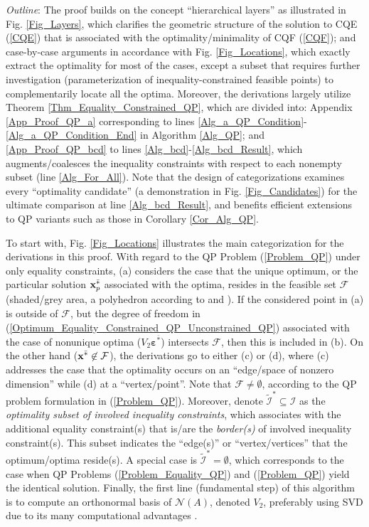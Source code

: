 \documentclass{imaman}
\newcommand{\bfx}{{\bf x}}
\newcommand{\bfvarepsilon}{{\boldsymbol \varepsilon}}
\newcommand{\calF}{{\mathcal F}}
\newcommand{\calI}{{\mathcal I}}
\newcommand{\calN}{{\mathcal N}}
\numberwithin{equation}{section}
\begin{document}
\textit{Outline}: The proof builds on the concept ``hierarchical layers'' as illustrated in Fig. \ref{Fig_Layers}, which clarifies the geometric structure of the solution to CQE (\ref{CQE}) that is associated with the optimality/minimality of CQF (\ref{CQF}); and case-by-case arguments in accordance with Fig. \ref{Fig_Locations}, which exactly extract the optimality for most of the cases, except a subset that requires further investigation (parameterization of inequality-constrained feasible points) to complementarily locate all the optima. Moreover, the derivations largely utilize Theorem \ref{Thm_Equality_Constrained_QP}, which are divided into: Appendix \ref{App_Proof_QP_a} corresponding to lines \ref{Alg_a_QP_Condition}-\ref{Alg_a_QP_Condition_End} in Algorithm \ref{Alg_QP}; and \ref{App_Proof_QP_bcd} to lines \ref{Alg_bcd}-\ref{Alg_bcd_Result}, which augments/coalesces the inequality constraints with respect to each nonempty subset (line \ref{Alg_For_All}). Note that the design of categorizations examines every ``optimality candidate'' (a demonstration in Fig. \ref{Fig_Candidates}) for the ultimate comparison at line \ref{Alg_bcd_Result}, and benefits efficient extensions to QP variants such as those in Corollary \ref{Cor_Alg_QP}.

To start with, Fig. \ref{Fig_Locations} illustrates the main categorization for the derivations in this proof. With regard to the QP Problem (\ref{Problem_QP}) under only equality constraints, (a) considers the case that the unique optimum, or the particular solution $\bfx_p^{\bar *}$ associated with the optima, resides in the feasible set $\calF$ (shaded/grey area, a polyhedron according to \cite{Lu(Ye):03(16)} and \cite{BoVa:04}). If the considered point in (a) is outside of $\calF$, but the degree of freedom in (\ref{Optimum_Equality_Constrained_QP_Unconstrained_QP}) associated with the case of nonunique optima ($V_2\bfvarepsilon^{\bar *}$) intersects $\calF$, then this is included in (b). On the other hand ($\bfx^{\bar *}\not\in\calF$), the derivations go to either (c) or (d), where (c) addresses the case that the optimality occurs on an ``edge/space of nonzero dimension'' while (d) at a ``vertex/point''. Note that $\calF\ne\emptyset$, according to the QP problem formulation in (\ref{Problem_QP}). Moreover, denote $\tilde\calI^*\subseteq\calI$ as the \textit{optimality subset of involved inequality constraints}, which associates with the additional equality constraint(s) that is/are the \textit{border(s)} of involved inequality constraint(s). This subset indicates the ``edge(s)'' or ``vertex/vertices'' that the optimum/optima reside(s). A special case is $\tilde\calI^*=\emptyset$, which corresponds to the case when QP Problems (\ref{Problem_Equality_QP}) and (\ref{Problem_QP}) yield the identical solution. Finally, the first line (fundamental step) of this algorithm is to compute an orthonormal basis of $\calN(A)$, denoted $V_2$, preferably using SVD due to its many computational advantages \citep{GoVa:13}.
\end{document}
